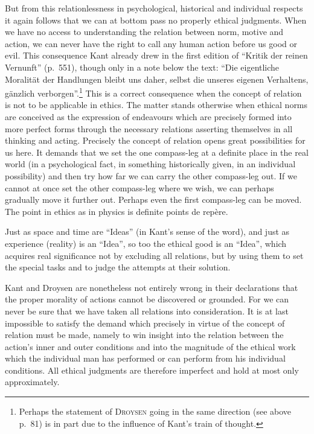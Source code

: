 \documentclass[12pt]{article}
\newcommand{\opage}[1]{\marginnote{\footnotesize\textit{[#1]}}}
\begin{document}
But from this relationlessness in psychological, historical and individual
respects it again follows that we can at bottom pass no \opage{93}properly ethical
judgments. When we have no access to understanding the relation between
norm, motive and action, we can never have the right to call any human
action before us good or evil. This consequence Kant already drew in the
first edition of ``Kritik der reinen Vernunft'' (p.~551), though only in a
note below the text: ``Die eigentliche Moralität der Handlungen bleibt uns
daher, selbst die unseres eigenen Verhaltens, gänzlich
verborgen''.\footnote{Perhaps the statement of \textsc{Droysen} going in the
same direction (see above p.~81) is in part due to the influence of Kant's
train of thought.} This is a correct consequence when the concept of
relation is not to be applicable in ethics. The matter stands otherwise when
ethical norms are conceived as the expression of endeavours which are
precisely formed into more perfect forms through the necessary relations
asserting themselves in all thinking and acting. Precisely the concept of
relation opens great possibilities for us here. It demands that we set the
one compass-leg at a definite place in the real world (in a psychological
fact, in something historically given, in an individual possibility) and
then try how far we can carry the other compass-leg out. If we cannot at
once set the other compass-leg where we wish, we can perhaps gradually move
it further out. Perhaps even the first compass-leg can be moved. The point
in ethics as in physics is definite points de repère.

Just as space and time are ``Ideas'' (in Kant's sense of the word), and just
as experience (reality) is an ``Idea'', so too the ethical good is an
``Idea'', which acquires real significance not by excluding all relations,
but by using them to set the special tasks and to judge the attempts at
their solution.

Kant and Droysen are nonetheless not entirely wrong in their \opage{94}declarations
that the proper morality of actions cannot be discovered or grounded. For we
can never be sure that we have taken all relations into consideration. It is
at last impossible to satisfy the demand which precisely in virtue of the
concept of relation must be made, namely to win insight into the relation
between the action's inner and outer conditions and into the magnitude of
the ethical work which the individual man has performed or can perform from
his individual conditions. All ethical judgments are therefore imperfect and
hold at most only approximately.
\end{document}
